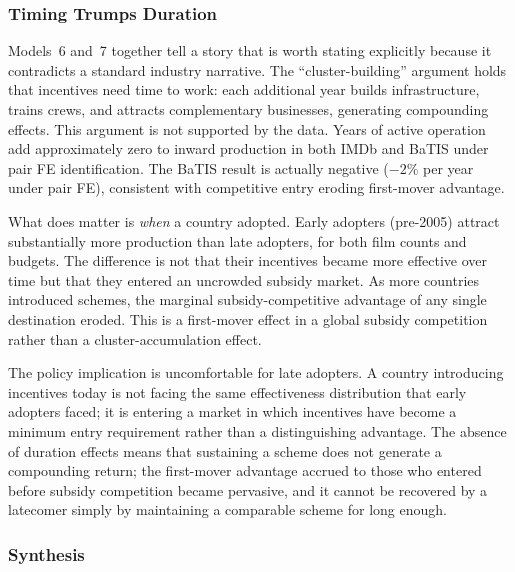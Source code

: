 \subsubsection{Timing Trumps Duration}

Models~6 and~7 together tell a story that is worth stating explicitly because it contradicts a standard industry narrative. The ``cluster-building'' argument holds that incentives need time to work: each additional year builds infrastructure, trains crews, and attracts complementary businesses, generating compounding effects. This argument is not supported by the data. Years of active operation add approximately zero to inward production in both IMDb and BaTIS under pair FE identification. The BaTIS result is actually negative ($-2\%$ per year under pair FE), consistent with competitive entry eroding first-mover advantage.

What does matter is \textit{when} a country adopted. Early adopters (pre-2005) attract substantially more production than late adopters, for both film counts and budgets. The difference is not that their incentives became more effective over time but that they entered an uncrowded subsidy market. As more countries introduced schemes, the marginal subsidy-competitive advantage of any single destination eroded. This is a first-mover effect in a global subsidy competition rather than a cluster-accumulation effect.

The policy implication is uncomfortable for late adopters. A country introducing incentives today is not facing the same effectiveness distribution that early adopters faced; it is entering a market in which incentives have become a minimum entry requirement rather than a distinguishing advantage. The absence of duration effects means that sustaining a scheme does not generate a compounding return; the first-mover advantage accrued to those who entered before subsidy competition became pervasive, and it cannot be recovered by a latecomer simply by maintaining a comparable scheme for long enough.

\subsubsection{Synthesis}

